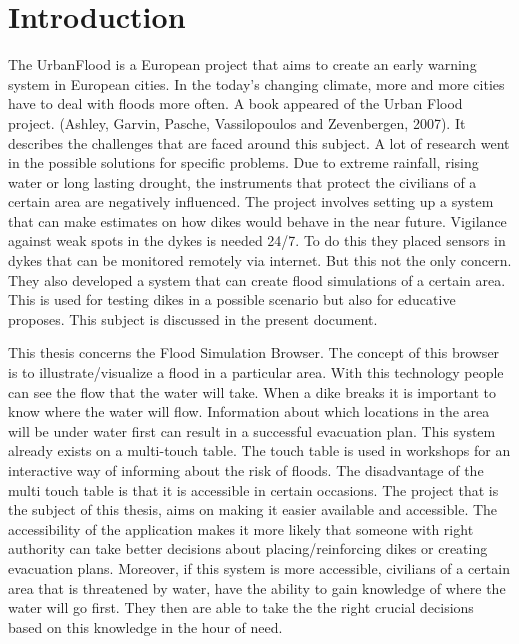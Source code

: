 
\section{Introduction}
The UrbanFlood is a European project that aims to create an early warning system in European cities\cite{UrbanFlood}. In the today's changing climate, more and more cities have to deal with floods more often. A book appeared of the Urban Flood project. (Ashley, Garvin,  Pasche,	Vassilopoulos and Zevenbergen, 2007)\cite{urbanflood1}. It describes the challenges that are faced around this subject. A lot of research went in the possible solutions for specific problems. Due to extreme rainfall, rising water or long lasting drought, the instruments that protect the civilians of a certain area are negatively influenced. The project involves setting up a system that can make estimates on how dikes would behave in the near future. Vigilance against weak spots in the dykes is needed 24/7. To do this they placed sensors in dykes that can be monitored remotely via internet. But this not the only concern. They also developed a system that can create flood simulations of a certain area. This is used for testing dikes in a possible scenario but also for educative proposes. This subject is discussed in the present document.

This thesis concerns the Flood Simulation Browser. The concept of this browser is to illustrate/visualize a flood in a particular area. With this technology people can see the flow that the water will take. When a dike breaks it is important to know where the water will flow. Information about which locations in the area will be under water first can result in a successful evacuation plan. This system already exists on a multi-touch table\cite{touchtable}. The touch table is used in workshops for an interactive way of informing about the risk of floods. The disadvantage of the multi touch table is that it is accessible in certain occasions. The project that is the subject of this thesis, aims on making it easier available and accessible. The accessibility of the application
 makes it more likely that someone with right authority can take better decisions about placing/reinforcing dikes or creating evacuation plans. Moreover, if this system is more accessible, civilians of a certain area that is threatened by water, have the ability to gain knowledge of where the water will go first. They then are able to take the the right crucial decisions based on this knowledge in the hour of need.

